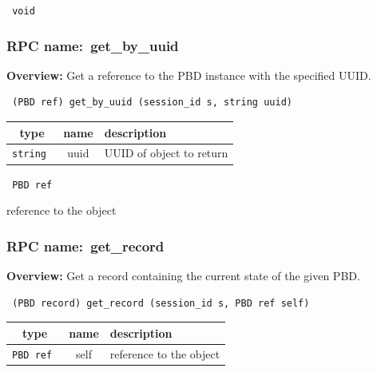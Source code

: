{\tt 
void
}



\vspace{0.3cm}
\vspace{0.3cm}
\vspace{0.3cm}
\subsubsection{RPC name:~get\_by\_uuid}

{\bf Overview:} 
Get a reference to the PBD instance with the specified UUID.

\begin{verbatim} (PBD ref) get_by_uuid (session_id s, string uuid)\end{verbatim}



 
\vspace{0.3cm}
\begin{tabular}{|c|c|p{7cm}|}
 \hline
{\bf type} & {\bf name} & {\bf description} \\ \hline
{\tt string } & uuid & UUID of object to return \\ \hline 

\end{tabular}

\vspace{0.3cm}

{\tt 
PBD ref
}


reference to the object
\vspace{0.3cm}
\vspace{0.3cm}
\vspace{0.3cm}
\subsubsection{RPC name:~get\_record}

{\bf Overview:} 
Get a record containing the current state of the given PBD.

\begin{verbatim} (PBD record) get_record (session_id s, PBD ref self)\end{verbatim}



 
\vspace{0.3cm}
\begin{tabular}{|c|c|p{7cm}|}
 \hline
{\bf type} & {\bf name} & {\bf description} \\ \hline
{\tt PBD ref } & self & reference to the object \\ \hline 

\end{tabular}

